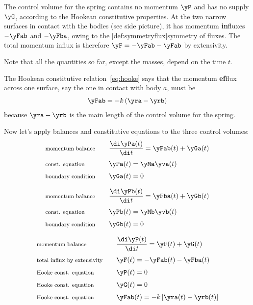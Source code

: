The control volume for the spring contains no momentum $\yP$ and has no supply $\yG$, according to the Hookean constitutive properties. At the two narrow surfaces in contact with the bodies (see side picture), it has momentum \textbf{in}fluxes $-\yFab$ and $-\yFba$, owing to the \autoref{def:symmetryflux}{symmetry of fluxes}. The total momentum influx is therefore $\yF=-\yFab-\yFab$ by extensivity.

Note that all the quantities so far, except the masses, depend on the time $t$.

The Hookean constitutive relation~\eqref{eq:hooke} says that the momentum \textbf{ef}flux across one surface, say the one in contact with body $a$, must be
\begin{equation*}
  \yFab = -k\,(\yra-\yrb)
\end{equation*}
because $\yra-\yrb$ is the main length of the control volume for the spring.

Now let's apply balances and constitutive equations to the three control volumes:
  \begin{equation*}
 \begin{aligned}
&\text{\footnotesize momentum balance} &\quad&\frac{\di\yPa(t)}{\di t} = \yFab(t) + \yGa(t)
      \\[\jot]
&\text{\footnotesize const. equation} &\quad&\yPa(t) = \yMa\yva(t)
      \\[\jot]
&\text{\footnotesize boundary condition} &\quad&\yGa(t) = 0
    \end{aligned}
  \end{equation*}

  \begin{equation*}
 \begin{aligned}
&\text{\footnotesize momentum balance} &\quad&\frac{\di\yPb(t)}{\di t} = \yFba(t) + \yGb(t)
      \\[\jot]
&\text{\footnotesize const. equation} &\quad&\yPb(t) = \yMb\yvb(t)
      \\[\jot]
&\text{\footnotesize boundary condition} &\quad&\yGb(t) = 0
    \end{aligned}
  \end{equation*}

  \begin{equation*}
 \begin{aligned}
&\text{\footnotesize momentum balance} &\quad&\frac{\di\yP(t)}{\di t} = \yF(t) + \yG(t)
      \\[\jot]
&\text{\footnotesize total influx by extensivity} &\quad&\yF(t) = -\yFab(t) - \yFba(t)
      \\[\jot]
&\text{\footnotesize Hooke const. equation} &\quad&\yP(t) = 0
      \\[\jot]
&\text{\footnotesize Hooke const. equation} &\quad&\yG(t) = 0
      \\[\jot]
&\text{\footnotesize Hooke const. equation} &\quad&\yFab(t) = -k\,[\yra(t)-\yrb(t)]
    \end{aligned}
  \end{equation*}



